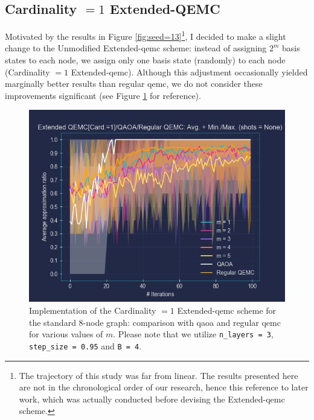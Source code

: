 \protect\subsection{Cardinality \texorpdfstring{$= 1$}{= 1} Extended-QEMC}
\label{subsection:Card._eq_1_Extended_QEMC}

Motivated by the results in Figure \ref{fig:seed=13}\footnote{The trajectory of this study was far from linear. The results presented here are not in the chronological order of our research, hence this reference to later work, which was actually conducted before devising the Extended-\acrshort{qemc} scheme.}, I decided to make a slight change to the Unmodified Extended-\acrshort{qemc} scheme: instead of assigning $2^m$ basis states to each node, we assign only one basis state (randomly) to each node (Cardinality $= 1$ Extended-\acrshort{qemc}). Although this adjustment occasionally yielded marginally better results than regular \acrshort{qemc}, we do not consider these improvements significant (see Figure \ref{fig:Card.=1_Extended-QEMC} for reference).
\begin{figure}[h]
    \centering
    \includegraphics[width=1\textwidth]{Figures/Chapter_5/Extended-QEMC/8-node[Card.=1](n_layers=3, step_size=0.95, m=All).png}
    \caption{Implementation of the Cardinality $= 1$ Extended-\acrshort{qemc} scheme for the standard $8$-node graph: comparison with \acrshort{qaoa} and regular \acrshort{qemc} for various values of $m$. Please note that we utilize \texttt{n\_layers = 3}, \texttt{step\_size = 0.95} and \texttt{B = 4}.}
    \label{fig:Card.=1_Extended-QEMC}
\end{figure}

